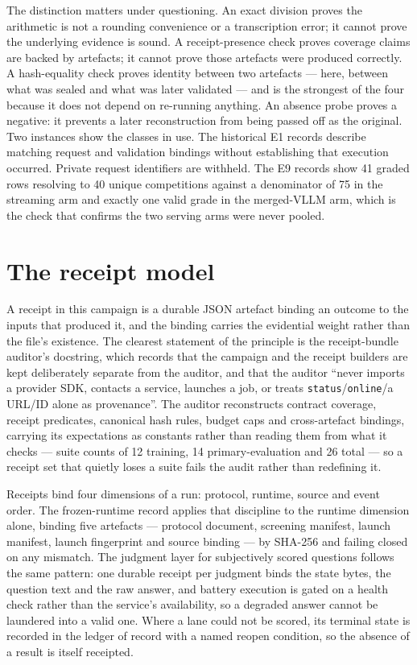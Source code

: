 \documentclass[12pt,a4paper]{report}
\begin{document}
The distinction matters under questioning. An exact division proves the
arithmetic is not a rounding convenience or a transcription error; it
cannot prove the underlying evidence is sound. A receipt-presence check
proves coverage claims are backed by artefacts; it cannot prove those
artefacts were produced correctly. A hash-equality check proves identity
between two artefacts --- here, between what was sealed and what was
later validated --- and is the strongest of the four because it does not
depend on re-running anything. An absence probe proves a negative: it
prevents a later reconstruction from being passed off as the original.
Two instances show the classes in use. The historical E1 records
describe matching request and validation bindings without establishing
that execution occurred. Private request identifiers are withheld. The
E9 records show 41 graded rows resolving to 40 unique competitions
against a denominator of 75 in the streaming arm and exactly one valid
grade in the merged-VLLM arm, which is the check that confirms the two
serving arms were never pooled.

\section{The receipt model}\label{the-receipt-model}

A receipt in this campaign is a durable JSON artefact binding an outcome
to the inputs that produced it, and the binding carries the evidential
weight rather than the file's existence. The clearest statement of the
principle is the receipt-bundle auditor's docstring, which records that
the campaign and the receipt builders are kept deliberately separate
from the auditor, and that the auditor ``never imports a provider SDK,
contacts a service, launches a job, or treats
\texttt{status}/\texttt{online}/a URL/ID alone as provenance''. The
auditor reconstructs contract coverage, receipt predicates, canonical
hash rules, budget caps and cross-artefact bindings, carrying its
expectations as constants rather than reading them from what it checks
--- suite counts of 12 training, 14 primary-evaluation and 26 total ---
so a receipt set that quietly loses a suite fails the audit rather than
redefining it.

Receipts bind four dimensions of a run: protocol, runtime, source and
event order. The frozen-runtime record applies that discipline to the
runtime dimension alone, binding five artefacts --- protocol document,
screening manifest, launch manifest, launch fingerprint and source
binding --- by SHA-256 and failing closed on any mismatch. The judgment
layer for subjectively scored questions follows the same pattern: one
durable receipt per judgment binds the state bytes, the question text
and the raw answer, and battery execution is gated on a health check
rather than the service's availability, so a degraded answer cannot be
laundered into a valid one. Where a lane could not be scored, its
terminal state is recorded in the ledger of record with a named reopen
condition, so the absence of a result is itself receipted.
\end{document}
